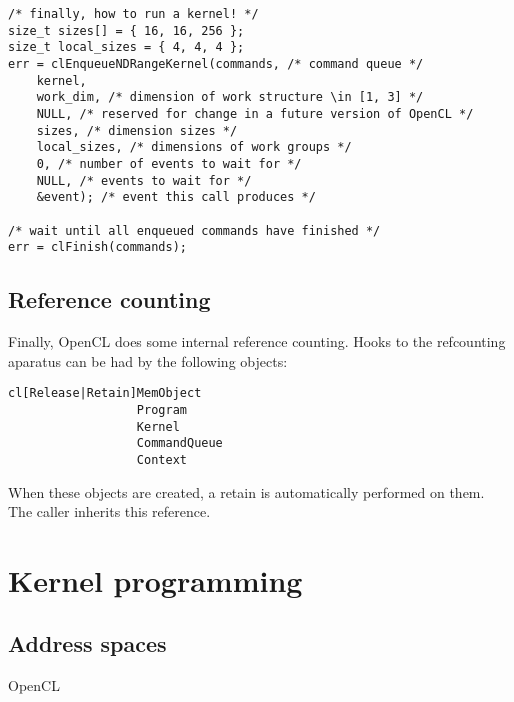 \documentclass{article}
\begin{document}
\begin{verbatim}
/* finally, how to run a kernel! */
size_t sizes[] = { 16, 16, 256 };
size_t local_sizes = { 4, 4, 4 };
err = clEnqueueNDRangeKernel(commands, /* command queue */
    kernel,
    work_dim, /* dimension of work structure \in [1, 3] */
    NULL, /* reserved for change in a future version of OpenCL */
    sizes, /* dimension sizes */
    local_sizes, /* dimensions of work groups */    
    0, /* number of events to wait for */
    NULL, /* events to wait for */
    &event); /* event this call produces */

/* wait until all enqueued commands have finished */
err = clFinish(commands);
\end{verbatim}

\subsection{Reference counting}
Finally, OpenCL does some internal reference counting.  Hooks to the 
refcounting aparatus can be had by the following objects:

\begin{verbatim}
cl[Release|Retain]MemObject
                  Program
                  Kernel
                  CommandQueue
                  Context
\end{verbatim}
When these objects are created, a retain is automatically performed on them.
The caller inherits this reference.

\section{Kernel programming}
\subsection{Address spaces}
OpenCL 
\end{document}
